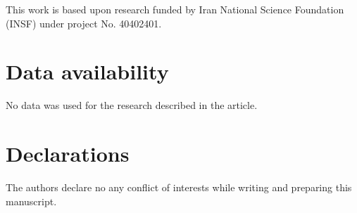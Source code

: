 \documentclass[11pt]{amsart}
\theoremstyle{definition}
\begin{document}
\bigskip

 This work is based upon research funded by Iran National Science Foundation (INSF) under project No. 40402401.

\medskip

\section*{Data availability}
No data was used for the research described in the article.

\section*{Declarations}
The authors declare no any conflict of interests while writing and preparing this manuscript.

\bigskip
\bigskip
\bigskip
\end{document}
